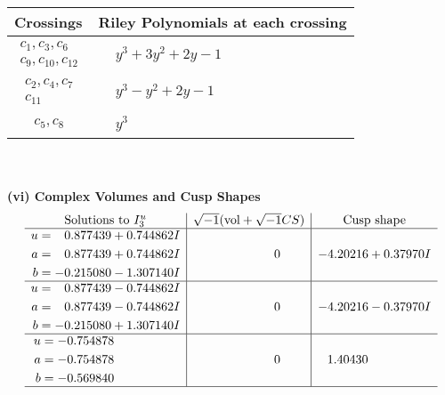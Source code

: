 \documentclass[1p]{elsarticle_modified}
\theoremstyle{definition}
\newcommand{\I}{\sqrt{-1}}
\begin{document}
\begin{tabular}{m{50pt}|m{274pt}}
Crossings & \hspace{64pt}Riley Polynomials at each crossing \\
\hline $$\begin{aligned}c_{1},c_{3},c_{6}\\c_{9},c_{10},c_{12}\end{aligned}$$&$\begin{aligned}
&y^3+3 y^2+2 y-1
\end{aligned}$\\
\hline $$\begin{aligned}c_{2},c_{4},c_{7}\\c_{11}\end{aligned}$$&$\begin{aligned}
&y^3- y^2+2 y-1
\end{aligned}$\\
\hline $$\begin{aligned}c_{5},c_{8}\end{aligned}$$&$\begin{aligned}
&y^3
\end{aligned}$\\
\hline
\end{tabular}\\~\\
\newpage\flushleft \textbf{(vi) Complex Volumes and Cusp Shapes}
$$\begin{array}{c|c|c}  
\text{Solutions to }I^u_{3}& \I (\text{vol} + \sqrt{-1}CS) & \text{Cusp shape}\\
 \hline 
\begin{aligned}
u &= \phantom{-}0.877439 + 0.744862 I \\
a &= \phantom{-}0.877439 + 0.744862 I \\
b &= -0.215080 - 1.307140 I\end{aligned}
 & \phantom{-0.000000 } 0 & -4.20216 + 0.37970 I \\ \hline\begin{aligned}
u &= \phantom{-}0.877439 - 0.744862 I \\
a &= \phantom{-}0.877439 - 0.744862 I \\
b &= -0.215080 + 1.307140 I\end{aligned}
 & \phantom{-0.000000 } 0 & -4.20216 - 0.37970 I \\ \hline\begin{aligned}
u &= -0.754878\phantom{ +0.000000I} \\
a &= -0.754878\phantom{ +0.000000I} \\
b &= -0.569840\phantom{ +0.000000I}\end{aligned}
 & \phantom{-0.000000 } 0 & \phantom{-}1.40430\phantom{ +0.000000I}\\
 \hline 
 \end{array}$$\newpage\newpage\renewcommand{\arraystretch}{1}
\end{document}
